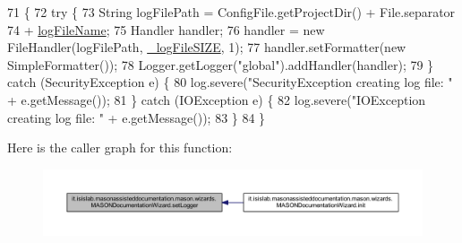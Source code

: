 \begin{DoxyCode}
71                              \{
72         \textcolor{keywordflow}{try} \{
73             String logFilePath = ConfigFile.getProjectDir() + File.separator
74                     + \hyperlink{classit_1_1isislab_1_1masonassisteddocumentation_1_1mason_1_1wizards_1_1_m_a_s_o_n_documentation_wizard_a4bd1c3db48ee70d751a4249cc3cf97c3}{logFileName};
75             Handler handler;
76             handler = \textcolor{keyword}{new} FileHandler(logFilePath, \hyperlink{classit_1_1isislab_1_1masonassisteddocumentation_1_1mason_1_1wizards_1_1_m_a_s_o_n_documentation_wizard_a988e57db933c354c9f7822a575c3b291}{\_logFileSIZE}, 1);
77             handler.setFormatter(\textcolor{keyword}{new} SimpleFormatter());
78             Logger.getLogger(\textcolor{stringliteral}{"global"}).addHandler(handler);
79         \} \textcolor{keywordflow}{catch} (SecurityException e) \{
80             log.severe(\textcolor{stringliteral}{"SecurityException creating log file: "} + e.getMessage());
81         \} \textcolor{keywordflow}{catch} (IOException e) \{
82             log.severe(\textcolor{stringliteral}{"IOException creating log file: "} + e.getMessage());
83         \}
84     \}
\end{DoxyCode}


Here is the caller graph for this function\-:
\nopagebreak
\begin{figure}[H]
\begin{center}
\leavevmode
\includegraphics[width=350pt]{classit_1_1isislab_1_1masonassisteddocumentation_1_1mason_1_1wizards_1_1_m_a_s_o_n_documentation_wizard_a82d1898a0c9e9c4ae83e19bf1f024238_icgraph}
\end{center}
\end{figure}




